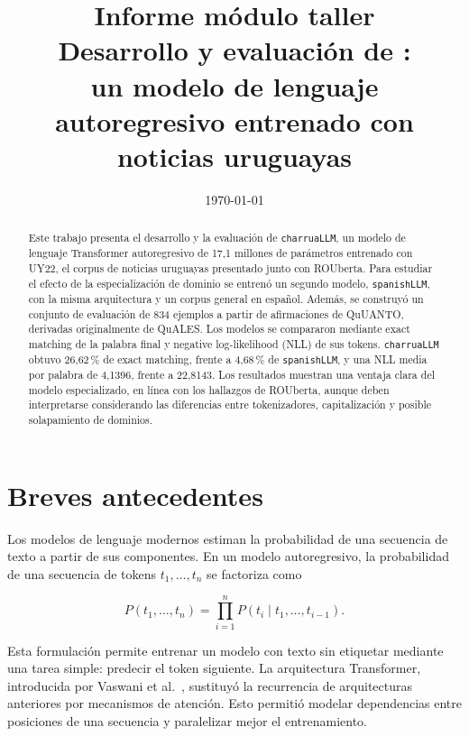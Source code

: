 \documentclass[11pt,a4paper]{article}
\title{\textbf{Informe módulo taller}\\[0.5em]
\large Desarrollo y evaluación de \charrua:\\
un modelo de lenguaje autoregresivo entrenado con noticias uruguayas}
\author{}
\date{\today}
\newcommand{\charrua}{\texttt{charruaLLM}}
\newcommand{\spanishmodel}{\texttt{spanishLLM}}
\begin{document}
\maketitle
\thispagestyle{empty}

\begin{abstract}
Este trabajo presenta el desarrollo y la evaluación de \charrua, un modelo de
lenguaje Transformer autoregresivo de 17,1 millones de parámetros entrenado con
UY22, el corpus de noticias uruguayas presentado junto con ROUberta. Para
estudiar el efecto de la especialización de dominio se entrenó un segundo
modelo, \spanishmodel, con la misma arquitectura y un corpus general en español.
Además, se construyó un conjunto de evaluación de 834 ejemplos a partir de
afirmaciones de QuUANTO, derivadas originalmente de QuALES. Los modelos se
compararon mediante exact matching de la palabra final y negative
log-likelihood (NLL) de sus tokens. \charrua{} obtuvo 26,62\,\% de exact
matching, frente a 4,68\,\% de \spanishmodel, y una NLL media por palabra de
4,1396, frente a 22,8143. Los resultados muestran una ventaja clara del modelo
especializado, en línea con los hallazgos de ROUberta, aunque deben
interpretarse considerando las diferencias entre tokenizadores, capitalización
y posible solapamiento de dominios.
\end{abstract}

\clearpage
\tableofcontents
\clearpage


\section{Breves antecedentes}

Los modelos de lenguaje modernos estiman la probabilidad de una secuencia de
texto a partir de sus componentes. En un modelo autoregresivo, la probabilidad
de una secuencia de tokens $t_1,\ldots,t_n$ se factoriza como

\begin{equation}
    P(t_1,\ldots,t_n)
    = \prod_{i=1}^{n} P(t_i \mid t_1,\ldots,t_{i-1}).
\end{equation}

Esta formulación permite entrenar un modelo con texto sin etiquetar mediante
una tarea simple: predecir el token siguiente. La arquitectura Transformer,
introducida por Vaswani et al.~\cite{vaswani2017}, sustituyó la recurrencia de
arquitecturas anteriores por mecanismos de atención. Esto permitió modelar
dependencias entre posiciones de una secuencia y paralelizar mejor el
entrenamiento.
\end{document}
